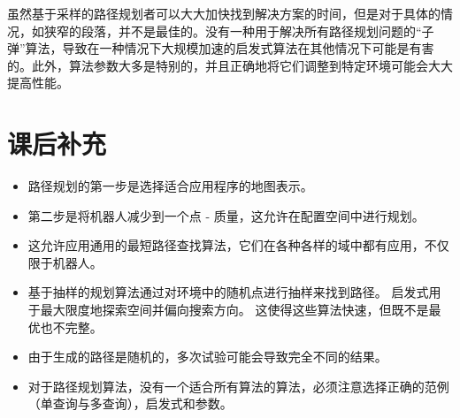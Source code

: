 虽然基于采样的路径规划者可以大大加快找到解决方案的时间，但是对于具体的情况，如狭窄的段落，并不是最佳的。没有一种用于解决所有路径规划问题的“子弹”算法，导致在一种情况下大规模加速的启发式算法在其他情况下可能是有害的。此外，算法参数大多是特别的，并且正确地将它们调整到特定环境可能会大大提高性能。


\section*{课后补充}
\begin{itemize}

\item 路径规划的第一步是选择适合应用程序的地图表示。
\item 第二步是将机器人减少到一个点 - 质量，这允许在配置空间中进行规划。
\item 这允许应用通用的最短路径查找算法，它们在各种各样的域中都有应用，不仅限于机器人。
\item 基于抽样的规划算法通过对环境中的随机点进行抽样来找到路径。 启发式用于最大限度地探索空间并偏向搜索方向。 这使得这些算法快速，但既不是最优也不完整。
\item 由于生成的路径是随机的，多次试验可能会导致完全不同的结果。
\item 对于路径规划算法，没有一个适合所有算法的算法，必须注意选择正确的范例（单查询与多查询），启发式和参数。
\end{itemize}

